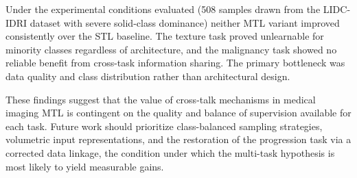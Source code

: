 Under the experimental conditions evaluated (508 samples drawn from the LIDC-IDRI dataset with severe solid-class dominance) neither MTL variant improved consistently over the STL baseline. The texture task proved unlearnable for minority classes regardless of architecture, and the malignancy task showed no reliable benefit from cross-task information sharing. The primary bottleneck was data quality and class distribution rather than architectural design.

These findings suggest that the value of cross-talk mechanisms in medical imaging MTL is contingent on the quality and balance of supervision available for each task. Future work should prioritize class-balanced sampling strategies, volumetric input representations, and the restoration of the progression task via a corrected data linkage, the condition under which the multi-task hypothesis is most likely to yield measurable gains.